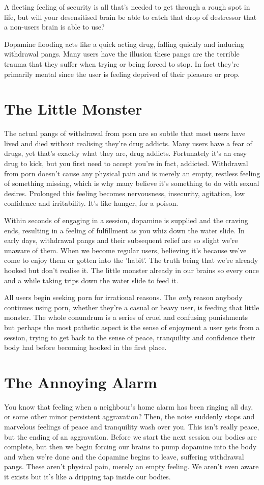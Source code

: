 \documentclass[easypeasy.tex]{subfiles}
\begin{document}
A fleeting feeling of security is all that's needed to get through a rough spot in life, but will your desensitised brain be able to catch that drop of destressor that a non-users brain is able to use?

Dopamine flooding acts like a quick acting drug, falling quickly and inducing withdrawal pangs. Many users have the illusion these pangs are the terrible trauma that they suffer when trying or being forced to stop. In fact they're primarily mental since the user is feeling deprived of their pleasure or prop.

\section{The Little Monster}
The actual pangs of withdrawal from porn are so subtle that most users have lived and died without realising they're drug addicts. Many users have a fear of drugs, yet that's exactly what they are, drug addicts. Fortunately it's an easy drug to kick, but you first need to accept you're in fact, addicted. Withdrawal from porn doesn't cause any physical pain and is merely an empty, restless feeling of something missing, which is why many believe it's something to do with sexual desires. Prolonged this feeling becomes nervousness, insecurity, agitation, low confidence and irritability. It's like hunger, for a poison.

Within seconds of engaging in a session, dopamine is supplied and the craving ends, resulting in a feeling of fulfillment as you whiz down the water slide. In early days, withdrawal pangs and their subsequent relief are so slight we're unaware of them. When we become regular users, believing it's because we've come to enjoy them or gotten into the 'habit'. The truth being that we're already hooked but don't realise it. The little monster already in our brains so every once and a while taking trips down the water slide to feed it.

All users begin seeking porn for irrational reasons. The \textit{only} reason anybody continues using porn, whether they're a casual or heavy user, is feeding that little monster. The whole conundrum is a series of cruel and confusing punishments but perhaps the most pathetic aspect is the sense of enjoyment a user gets from a session, trying to get back to the sense of peace, tranquility and confidence their body had before becoming hooked in the first place.

\section{The Annoying Alarm}
You know that feeling when a neighbour's home alarm has been ringing all day, or some other minor persistent aggravation? Then, the noise suddenly stops and marvelous feelings of peace and tranquility wash over you. This isn't really peace, but the ending of an aggravation. Before we start the next session our bodies are complete, but then we begin forcing our brains to pump dopamine into the body and when we're done and the dopamine begins to leave, suffering withdrawal pangs. These aren't physical pain, merely an empty feeling. We aren't even aware it exists but it's like a dripping tap inside our bodies.
\end{document}
